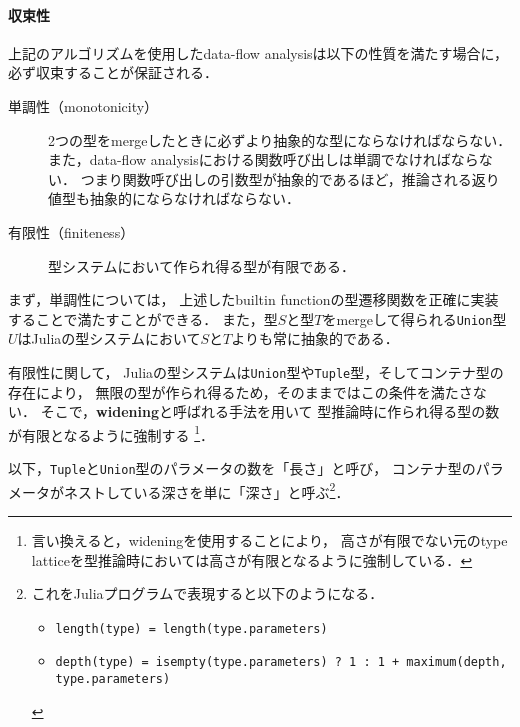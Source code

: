 \paragraph{収束性} \label{paragraph:inference-convergence}

上記のアルゴリズムを使用したdata-flow analysisは以下の性質を満たす場合に，
必ず収束することが保証される\cite{graph-free-data-flow-analysis, jameson}．

\begin{description}
  \item [単調性（monotonicity）]
        2つの型をmergeしたときに必ずより抽象的な型にならなければならない．
        また，data-flow analysisにおける関数呼び出しは単調でなければならない．
        つまり関数呼び出しの引数型が抽象的であるほど，推論される返り値型も抽象的にならなければならない．
  \item [有限性（finiteness）] 型システムにおいて作られ得る型が有限である．
\end{description}

まず，単調性については，
上述したbuiltin functionの型遷移関数を正確に実装することで満たすことができる．
また，型\(S\)と型\(T\)をmergeして得られる\verb|Union|型\(U\)\footnotemark はJuliaの型システムにおいて\(S\)と\(T\)よりも常に抽象的である．


有限性に関して，
Juliaの型システムは\verb|Union|型や\verb|Tuple|型，そしてコンテナ型の存在により，
無限の型が作られ得るため，そのままではこの条件を満たさない．
そこで，\textbf{widening}と呼ばれる手法を用いて
型推論時に作られ得る型の数が有限となるように強制する
\footnote{
  言い換えると，wideningを使用することにより，
  高さが有限でない元のtype latticeを型推論時においては高さが有限となるように強制している．
}．

以下，\verb|Tuple|と\verb|Union|型のパラメータの数を「長さ」と呼び，
コンテナ型のパラメータがネストしている深さを単に「深さ」と呼ぶ\footnote{
  これをJuliaプログラムで表現すると以下のようになる．
  \begin{itemize}
    \item \texttt{length(type) = length(type.parameters)}
    \item \texttt{depth(type) = isempty(type.parameters) ? 1 : 1 + maximum(depth, type.parameters)}
  \end{itemize}
}．

